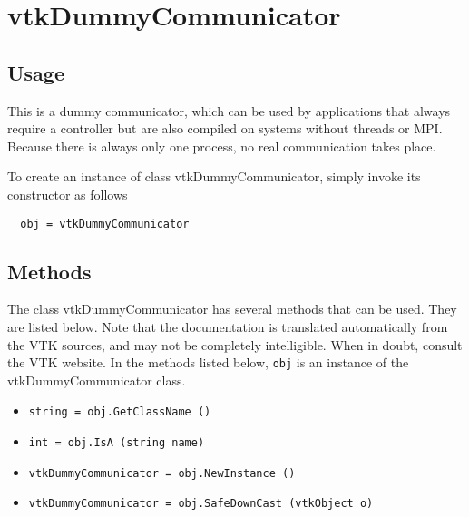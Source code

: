 \section{vtkDummyCommunicator}

\subsection{Usage}


 This is a dummy communicator, which can be used by applications that always
 require a controller but are also compiled on systems without threads or MPI.
 Because there is always only one process, no real communication takes place.


To create an instance of class vtkDummyCommunicator, simply
invoke its constructor as follows
\begin{verbatim}
  obj = vtkDummyCommunicator
\end{verbatim}
\subsection{Methods}

The class vtkDummyCommunicator has several methods that can be used.
  They are listed below.
Note that the documentation is translated automatically from the VTK sources,
and may not be completely intelligible.  When in doubt, consult the VTK website.
In the methods listed below, \verb|obj| is an instance of the vtkDummyCommunicator class.
\begin{itemize}
\item  \verb|string = obj.GetClassName ()|

\item  \verb|int = obj.IsA (string name)|

\item  \verb|vtkDummyCommunicator = obj.NewInstance ()|

\item  \verb|vtkDummyCommunicator = obj.SafeDownCast (vtkObject o)|

\end{itemize}
